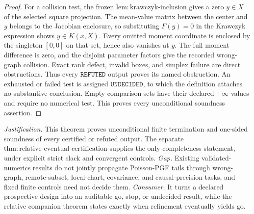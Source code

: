 \documentclass{article}
\begin{document}
\begin{proof}
For a collision test, the frozen \(\mathrm{lem{:}krawczyk\text{-}inclusion}\) gives a zero \(y\in X\) of the selected square projection.  The mean-value matrix between the center and \(y\) belongs to the Jacobian enclosure, so substituting \(F(y)=0\) in the Krawczyk expression shows \(y\in K(x,X)\).  Every omitted moment coordinate is enclosed by the singleton \([0,0]\) on that set, hence also vanishes at \(y\).  The full moment difference is zero, and the disjoint parameter factors give the recorded wrong-graph collision.  Exact rank defect, invalid boxes, and simplex failure are direct obstructions.  Thus every \(\mathtt{REFUTED}\) output proves its named obstruction.  An exhausted or failed test is assigned \(\mathtt{UNDECIDED}\), to which the definition attaches no substantive conclusion.  Empty comparison sets have their declared \(+\infty\) values and require no numerical test.  This proves every unconditional soundness assertion.
\end{proof}
\par\smallskip\noindent \textit{Justification.} This theorem proves unconditional finite termination and one-sided soundness of every certified or refuted output. The separate \(\mathrm{thm{:}relative\text{-}eventual\text{-}certification}\) supplies the only completeness statement, under explicit strict slack and convergent controls. \textit{Gap.} Existing validated-numerics results do not jointly propagate Poisson-PGF tails through wrong-graph, remote-subset, local-chart, covariance, and causal-precision tasks, and fixed finite controls need not decide them. \textit{Consumer.} It turns a declared prospective design into an auditable go, stop, or undecided result, while the relative companion theorem states exactly when refinement eventually yields go.
\end{document}
